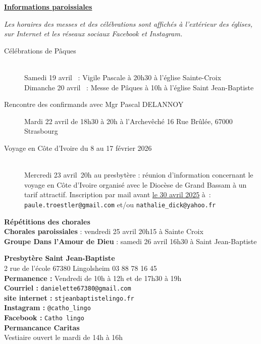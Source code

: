 \documentclass[11pt,a4paper]{article}
\newcommand{\NewsItem}[1]{%
\vspace{3pt}
\underline{\textbf{#1}}
		  }
\begin{document}
\NewsItem{Informations paroissiales}

\textit{Les horaires des messes et des célébrations sont affichés à l’extérieur des églises, sur Internet et les réseaux sociaux Facebook et Instagram.}



\begin{framed}
\begin{description}
\item[Célébrations de Pâques]
~\\
Samedi 19 avril              : Vigile Pascale à 20h30 à l’église Sainte-Croix\\
Dimanche 20 avril         : Messe de Pâques à 10h à l’église Saint Jean-Baptiste
\item[Rencontre des confirmands avec Mgr Pascal DELANNOY]
Mardi 22 avril de 18h30 à 20h à l’Archevêché 16 Rue Brûlée, 67000 Strasbourg
\item[Voyage en Côte d’Ivoire du 8 au 17 février 2026]
~\\
Mercredi 23 avril 20h au presbytère : réunion d’information concernant le voyage en Côte d’Ivoire
organisé avec le Diocèse de Grand Bassam à un tarif attractif.
Inscription par mail avant \underline{le 30 avril 2025} à : \texttt{paule.troestler@gmail.com} et/ou   \texttt{nathalie\_dick@yahoo.fr}
\end{description}
\end{framed}


\textbf{Répétitions des chorales}\\
\textbf{Chorales paroissiales} : vendredi 25 avril 20h15 à Sainte Croix\\
\textbf{Groupe \og Dans l’Amour de Dieu \fg} : samedi 26 avril 16h30 à Saint Jean-Baptiste

\begin{multicols}{2}
\textbf{Presbytère Saint Jean-Baptiste}\\
2 rue de l'école 67380 Lingolsheim 03 88 78 16 45\\
\textbf{Permanence :} Vendredi de 10h à 12h et de 17h30 à 19h\\
\textbf{Courriel :} \texttt{danielette67380@gmail.com}\\
\textbf{site internet :} \texttt{stjeanbaptistelingo.fr}\\
\textbf{Instagram :} \texttt{@catho\_lingo}\\
\textbf{Facebook :} \texttt{Catho lingo}\\
\textbf{Permancance Caritas}\\ Vestiaire ouvert le mardi de 14h à 16h\\
\end{multicols}
\end{document}
